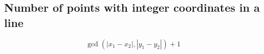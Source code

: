 \subsection{Number of points with integer coordinates in a line}

$$\gcd(|x_1 - x_2|, |y_1 - y_2|) + 1$$
